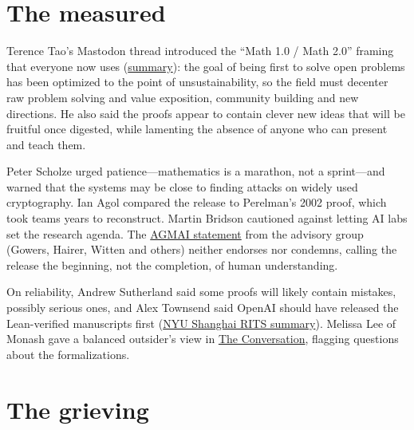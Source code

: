 \documentclass[11pt]{article}
\begin{document}
\section*{The measured}

Terence Tao's Mastodon thread introduced the ``Math 1.0 / Math 2.0'' framing
that everyone now uses
(\href{https://blog.donweb.com/terence-tao-openai-matematica-math-1-0/}{summary}):
the goal of being first to solve open problems has been optimized to the point
of unsustainability, so the field must decenter raw problem solving and value
exposition, community building and new directions. He also said the proofs
appear to contain clever new ideas that will be fruitful once digested, while
lamenting the absence of anyone who can present and teach them.

Peter Scholze urged patience---mathematics is a marathon, not a sprint---and
warned that the systems may be close to finding attacks on widely used
cryptography. Ian Agol compared the release to Perelman's 2002 proof, which
took teams years to reconstruct. Martin Bridson cautioned against letting AI
labs set the research agenda. The
\href{https://agmai.org/\#openai-release}{AGMAI statement} from the advisory
group (Gowers, Hairer, Witten and others) neither endorses nor condemns,
calling the release the beginning, not the completion, of human understanding.

On reliability, Andrew Sutherland said some proofs will likely contain
mistakes, possibly serious ones, and Alex Townsend said OpenAI should have
released the Lean-verified manuscripts first
(\href{https://rits.shanghai.nyu.edu/ai/openai-drops-722-math-manuscripts-from-an-unreleased-model}{NYU Shanghai RITS summary}).
Melissa Lee of Monash gave a balanced outsider's view in
\href{https://www.zmescience.com/science/news-science/openai-released-722-math-papers-at-once-and-mathematicians-are-freaking-out/}{The Conversation},
flagging questions about the formalizations.

\section*{The grieving}
\end{document}
